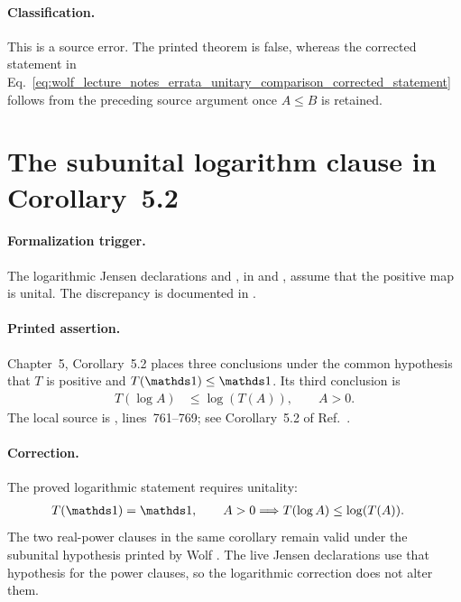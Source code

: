 \documentclass{article}
\begin{document}
\paragraph{Classification.}
This is a source error. The printed theorem is false, whereas the corrected
statement in
Eq.~\ref{eq:wolf_lecture_notes_errata_unitary_comparison_corrected_statement}
follows from the preceding source argument once $A\leq B$ is retained.

\section{The subunital logarithm clause in Corollary~5.2}
\label{sec:cor52-log}

\paragraph{Formalization trigger.}
The logarithmic Jensen declarations
 and
, in
 and
, assume that the positive
map is unital. The discrepancy is documented in
.

\paragraph{Printed assertion.}
Chapter~5, Corollary~5.2 places three conclusions under the common hypothesis
that $T$ is positive and $T(\one)\leq\one$. Its third conclusion is
\begin{align}
    T(\log A)
        &\leq\log(T(A)),
        \qquad A>0.
    \label{eq:wolf_lecture_notes_errata_log_printed_subunital_clause}
\end{align}
The local source is
,
lines~761--769; see Corollary~5.2 of Ref.~\cite{Wolf2012Quantum}.

\paragraph{Correction.}
The proved logarithmic statement requires unitality:
\begin{align}
    T(\one)=\one,\qquad A>0
        &\Longrightarrow
        T(\log A)\leq\log(T(A)).
    \label{eq:wolf_lecture_notes_errata_log_corrected_unital_clause}
\end{align}
The two real-power clauses in the same corollary remain valid under the
subunital hypothesis printed by Wolf \cite[Corollary~5.2]{Wolf2012Quantum}.
The live Jensen declarations use that hypothesis for the power clauses, so
the logarithmic correction does not alter them.
\end{document}
